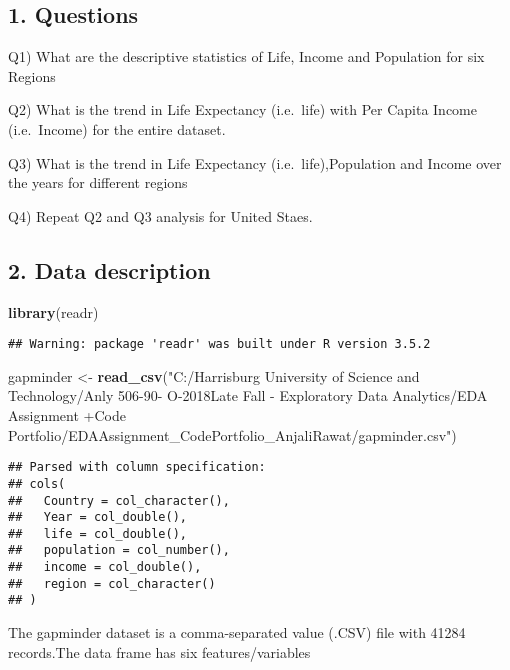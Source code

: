\documentclass[]{article}
\newenvironment{Shaded}{\begin{snugshade}}{\end{snugshade}}
\newcommand{\KeywordTok}[1]{\textcolor[rgb]{0.13,0.29,0.53}{\textbf{#1}}}
\newcommand{\StringTok}[1]{\textcolor[rgb]{0.31,0.60,0.02}{#1}}
\newcommand{\NormalTok}[1]{#1}
\begin{document}
\subsection{1. Questions}\label{questions}

Q1) What are the descriptive statistics of Life, Income and Population
for six Regions

Q2) What is the trend in Life Expectancy (i.e.~life) with Per Capita
Income (i.e.~Income) for the entire dataset.

Q3) What is the trend in Life Expectancy (i.e.~life),Population and
Income over the years for different regions

Q4) Repeat Q2 and Q3 analysis for United Staes.

\subsection{2. Data description}\label{data-description}

\begin{Shaded}
\begin{Highlighting}[]
\KeywordTok{library}\NormalTok{(readr)}
\end{Highlighting}
\end{Shaded}

\begin{verbatim}
## Warning: package 'readr' was built under R version 3.5.2
\end{verbatim}

\begin{Shaded}
\begin{Highlighting}[]
\NormalTok{gapminder <-}\StringTok{ }\KeywordTok{read_csv}\NormalTok{(}\StringTok{"C:/Harrisburg University of Science and Technology/Anly 506-90- O-2018Late Fall - Exploratory Data Analytics/EDA Assignment +Code Portfolio/EDAAssignment_CodePortfolio_AnjaliRawat/gapminder.csv"}\NormalTok{)}
\end{Highlighting}
\end{Shaded}

\begin{verbatim}
## Parsed with column specification:
## cols(
##   Country = col_character(),
##   Year = col_double(),
##   life = col_double(),
##   population = col_number(),
##   income = col_double(),
##   region = col_character()
## )
\end{verbatim}

The gapminder dataset is a comma-separated value (.CSV) file with 41284
records.The data frame has six features/variables
\end{document}
